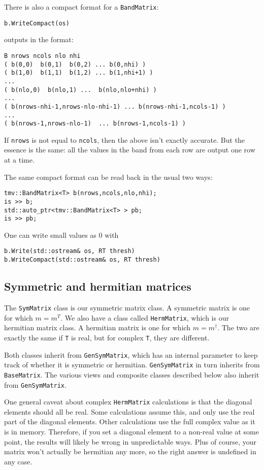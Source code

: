 \documentclass[twoside,letterpaper,11pt]{article}
\renewcommand{\tt}[1]{{\texttt {#1}}}
\begin{document}
There is also a compact format for a \tt{BandMatrix}:
\begin{verbatim}
b.WriteCompact(os)
\end{verbatim}
outputs in the format:
\begin{verbatim}
B nrows ncols nlo nhi
( b(0,0)  b(0,1)  b(0,2) ... b(0,nhi) )
( b(1,0)  b(1,1)  b(1,2) ... b(1,nhi+1) )
...
( b(nlo,0)  b(nlo,1) ...  b(nlo,nlo+nhi) )
...
( b(nrows-nhi-1,nrows-nlo-nhi-1) ... b(nrows-nhi-1,ncols-1) )
...
( b(nrows-1,nrows-nlo-1)  ... b(nrows-1,ncols-1) )
\end{verbatim}
If \tt{nrows} is not equal to \tt{ncols}, then the above isn't exactly accurate.  But the
essence is the same: all the values in the band from each row are output one row at a time.

The same compact format can be read back in the usual two ways:
\begin{verbatim}
tmv::BandMatrix<T> b(nrows,ncols,nlo,nhi);
is >> b;
std::auto_ptr<tmv::BandMatrix<T> > pb;
is >> pb;
\end{verbatim}

One can write small values as 0 with
\begin{verbatim}
b.Write(std::ostream& os, RT thresh)
b.WriteCompact(std::ostream& os, RT thresh)
\end{verbatim}

\subsection{Symmetric and hermitian matrices}

The \tt{SymMatrix} class is our symmetric matrix class.  A symmetric matrix is
one for which $m = m^T$.  We also have a class called
\tt{HermMatrix}, which is our hermitian matrix class.  A hermitian matrix
is one for which $m = m^\dagger$.  The two are exactly the same 
if \tt{T} is real, but for complex \tt{T}, they are different.

Both classes inherit from \tt{GenSymMatrix},
which has an internal parameter to keep track
of whether it is symmetric or hermitian.
\tt{GenSymMatrix} in turn inherits from \tt{BaseMatrix}.  
The various views and composite classes described below 
also inherit from \tt{GenSymMatrix}.

One general caveat about complex \tt{HermMatrix} calculations is that the diagonal
elements should all be real.  Some calculations assume this, and only 
use the real part of the diagonal elements.  Other calculations use the 
full complex value as it is in memory.  Therefore, if you set a diagonal element 
to a non-real value at some point, the results will likely be wrong in
unpredictable ways.  Plus of course, your matrix won't actually be hermitian any more,
so the right answer is undefined in any case.
\end{document}
